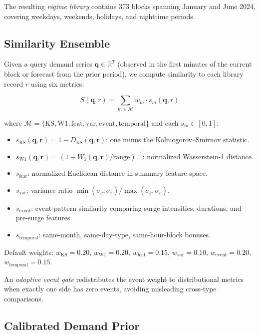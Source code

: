 \documentclass[conference,10pt]{IEEEtran}
\begin{document}
The resulting \emph{regime library} contains 373 blocks spanning January
and June 2024, covering weekdays, weekends, holidays, and nighttime periods.

\subsection{Similarity Ensemble}
\label{sec:method:similarity}

Given a query demand series $\mathbf{q} \in \mathbb{R}^T$ (observed in the
first minutes of the current block or forecast from the prior period),
we compute similarity to each library record $r$ using six metrics:

\begin{equation}
  S(\mathbf{q}, r) = \sum_{m \in \mathcal{M}} w_m \cdot s_m(\mathbf{q}, r)
  \label{eq:similarity}
\end{equation}

where $\mathcal{M} = \{\text{KS}, \text{W1}, \text{feat}, \text{var}, \text{event}, \text{temporal}\}$ and each $s_m \in [0,1]$:

\begin{itemize}
  \item $s_\text{KS}(\mathbf{q}, \mathbf{r}) = 1 - D_\text{KS}(\mathbf{q}, \mathbf{r})$: one minus the Kolmogorov--Smirnov statistic.
  \item $s_\text{W1}(\mathbf{q}, \mathbf{r}) = (1 + W_1(\mathbf{q}, \mathbf{r}) / \text{range})^{-1}$: normalized Wasserstein-1 distance.
  \item $s_\text{feat}$: normalized Euclidean distance in summary feature space.
  \item $s_\text{var}$: variance ratio $\min(\sigma_q, \sigma_r) / \max(\sigma_q, \sigma_r)$.
  \item $s_\text{event}$: event-pattern similarity comparing surge intensities, durations, and pre-surge features.
  \item $s_\text{temporal}$: same-month, same-day-type, same-hour-block bonuses.
\end{itemize}

Default weights: $w_\text{KS} = 0.20$, $w_\text{W1} = 0.20$, $w_\text{feat} = 0.15$, $w_\text{var} = 0.10$, $w_\text{event} = 0.20$, $w_\text{temporal} = 0.15$.

An \emph{adaptive event gate} redistributes the event weight to distributional
metrics when exactly one side has zero events, avoiding misleading cross-type
comparisons.

\subsection{Calibrated Demand Prior}
\label{sec:method:calibration}
\end{document}
